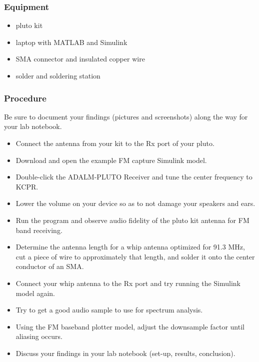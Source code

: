\subsubsection{Equipment}
\begin{itemize}
    \item pluto kit
    \item laptop with MATLAB and Simulink
    \item SMA connector and insulated copper wire
    \item solder and soldering station
\end{itemize}

\subsubsection{Procedure}
Be sure to document your findings (pictures and screenshots) along the way for your lab notebook. 
\begin{itemize}
    \item Connect the antenna from your kit to the Rx port of your pluto.
    \item Download and open the example FM capture Simulink model.
    \item Double-click the ADALM-PLUTO Receiver and tune the center frequency to KCPR.
    \item Lower the volume on your device so as to not damage your speakers and ears. 
    \item Run the program and observe audio fidelity of the pluto kit antenna for FM band receiving.
    \item Determine the antenna length for a whip antenna optimized for 91.3 MHz, cut a piece of wire to approximately that length, and solder it onto the center conductor of an SMA.
    \item Connect your whip antenna to the Rx port and try running the Simulink model again.
    \item Try to get a good audio sample to use for spectrum analysis.
    \item Using the FM baseband plotter model, adjust the downsample factor until aliasing occurs.
    \item Discuss your findings in your lab notebook (set-up, results, conclusion).
\end{itemize}

